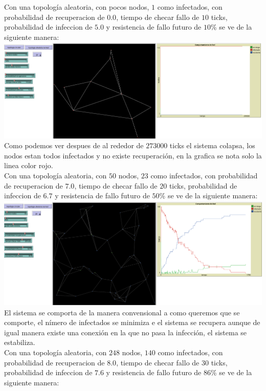 \documentclass[12pt]{article}
\begin{document}
Con una topología aleatoria, con pocos nodos, $1$ como infectados, con probabilidad de recuperacion de $0.0$, tiempo de checar fallo de $10$ ticks, probabilidad de infeccion de $5.0$ y resistencia de fallo futuro de $10$\% se ve de la siguiente manera:\\

\textbf{\includegraphics[scale = 0.28]{images/images2.png}} Como podemos ver despues de al rededor de $273000$ ticks el sistema colapsa, los nodos estan todos infectados y no existe recuperación, en la grafica se nota solo la linea color rojo.\\

Con una topología aleatoria, con $50$ nodos, $23$ como infectados, con probabilidad de recuperacion de $7.0$, tiempo de checar fallo de $20$ ticks, probabilidad de infeccion de $6.7$ y resistencia de fallo futuro de $50$\% se ve de la siguiente manera:\\

\textbf{\includegraphics[scale = 0.28]{images/images3.png}} El sistema se comporta de la manera convensional a como queremos que se comporte, el nímero de infectados se minimiza e el sistema se recupera aunque de igual manera existe una conexión en la que no pasa la infección, el sistema se estabiliza.\\

Con una topología aleatoria, con $248$ nodos, $140$ como infectados, con probabilidad de recuperacion de $8.0$, tiempo de checar fallo de $30$ ticks, probabilidad de infeccion de $7.6$ y resistencia de fallo futuro de $86$\% se ve de la siguiente manera:\\
\end{document}
